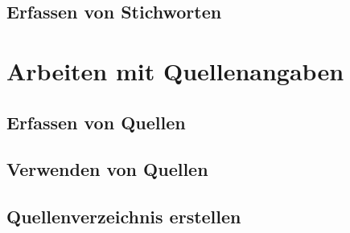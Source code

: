 \documentclass[12pt, a4paper, sectionentrydots=true, listof=totoc, listof=entryprefix, numbers=endperiod]{scrartcl}
\newcounter{SeitenzahlSpeicherRoman}
\begin{document}
\subsection{Erfassen von Stichworten}
\begin{spacing}{1.25}

\end{spacing}
%
%
%
%
%
%
\pagebreak 
\section{Arbeiten mit Quellenangaben}
\begin{spacing}{1.25}

\end{spacing}
%
%
\subsection{Erfassen von Quellen}
\begin{spacing}{1.25}

\end{spacing}
%
%
\subsection{Verwenden von Quellen}
\begin{spacing}{1.25}

\end{spacing}
%
%
\subsection{Quellenverzeichnis erstellen}
\begin{spacing}{1.25}

\end{spacing}
%
%
%
%
%
%
%
%
%
%
%
\pagebreak 
\clearpage
{}
\setcounter{page}{\theSeitenzahlSpeicherRoman}
\addtocounter{page}{1}
\ofoot{\thepage{}}
%
%
%
%
%
\clearpage
\end{document}
